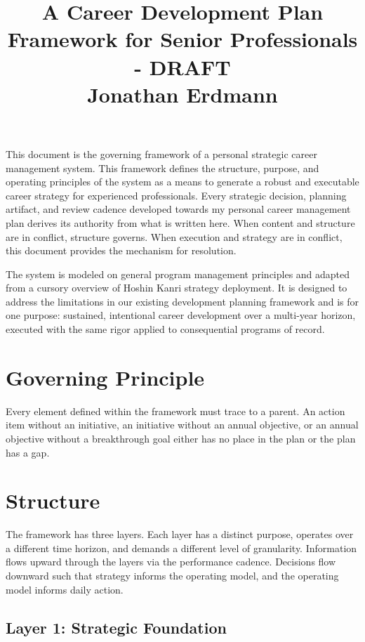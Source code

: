\documentclass{article}
\title{A Career Development Plan Framework for Senior Professionals - DRAFT\\ [1em]
	\large Jonathan Erdmann \\ [1em]
}
\begin{document}
\maketitle

This document is the governing framework of a personal strategic career management system.
This framework defines the structure, purpose, and operating principles of the system as a means to 
generate a robust and executable career strategy for experienced professionals.
Every strategic decision, planning artifact, and review cadence developed towards my personal 
career management plan derives its authority from what is written here. When content and structure 
are in conflict, structure governs. When execution and strategy are in conflict,
this document provides the mechanism for resolution.

The system is modeled on general program management principles and adapted from a cursory overview of 
Hoshin Kanri strategy deployment. It is designed to address the limitations in our existing development planning 
framework and is for one purpose: sustained, intentional career development over a multi-year horizon, executed 
with the same rigor applied to consequential programs of record.

\section{Governing Principle}

Every element defined within the framework must trace to a parent.
An action item without an initiative, an initiative without an annual objective, or an annual objective without
a breakthrough goal either has no place in the plan or the plan has a gap.

\section{Structure}

The framework has three layers. Each layer has a distinct purpose, operates over a different time horizon,
and demands a different level of granularity. Information flows upward through the layers via the performance cadence.
Decisions flow downward such that strategy informs the operating model, and the operating model informs daily action.

\subsection{Layer 1: Strategic Foundation}
\end{document}
